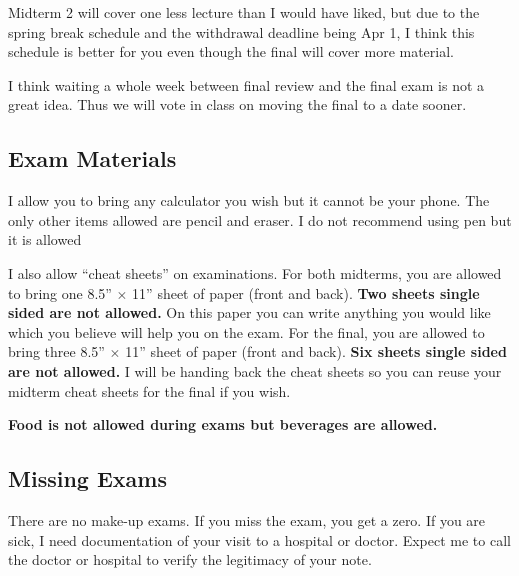 \documentclass[12pt]{article}
\newcommand{\inred}[1]{\color{red}\textbf{#1} \color{black}}
\newcommand{\qu}[1]{``#1''}
\begin{document}
Midterm 2 will cover one less lecture than I would have liked, but due to the spring break schedule and the withdrawal deadline being Apr 1, I think this schedule is better for you even though the final will cover more material.

I think waiting a whole week between final review and the final exam is not a great idea. Thus we will vote in class on moving the final to a date sooner.

\subsection*{Exam Materials}

I allow you to bring any calculator you wish but it cannot be your phone. The only other items allowed are pencil and eraser. I do not recommend using pen but it is allowed

I also allow \qu{cheat sheets} on examinations. For both midterms, you are allowed to bring one 8.5'' $\times$ 11'' sheet of paper (front and back). \inred{Two sheets single sided are not allowed.} On this paper you can write anything you would like which you believe will help you on the exam. For the final, you are allowed to bring three 8.5'' $\times$ 11'' sheet of paper (front and back). \inred{Six sheets single sided are not allowed.} I will be handing back the cheat sheets so you can reuse your midterm cheat sheets for the final if you wish. 

\inred{Food is not allowed during exams but beverages are allowed.}

%
%


\subsection*{Missing Exams}

There are no make-up exams. If you miss the exam, you get a zero. If you are sick, I need documentation of your visit to a hospital or doctor. Expect me to call the doctor or hospital to verify the legitimacy of your note. %
\end{document}
